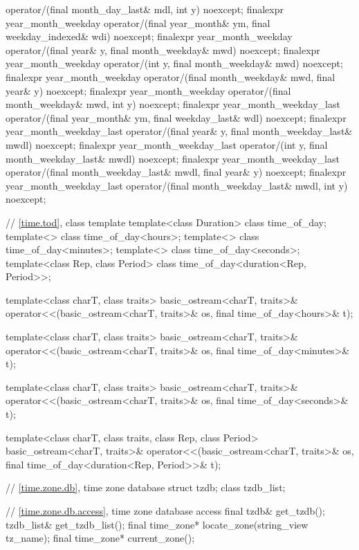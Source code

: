 \begin{codeblock}
{{      operator/(final month_day_last& mdl, int y) noexcept;
    finalexpr year_month_weekday
      operator/(final year_month& ym, final weekday_indexed& wdi) noexcept;
    finalexpr year_month_weekday
      operator/(final year& y, final month_weekday& mwd) noexcept;
    finalexpr year_month_weekday
      operator/(int y, final month_weekday& mwd) noexcept;
    finalexpr year_month_weekday
      operator/(final month_weekday& mwd, final year& y) noexcept;
    finalexpr year_month_weekday
      operator/(final month_weekday& mwd, int y) noexcept;
    finalexpr year_month_weekday_last
      operator/(final year_month& ym, final weekday_last& wdl) noexcept;
    finalexpr year_month_weekday_last
      operator/(final year& y, final month_weekday_last& mwdl) noexcept;
    finalexpr year_month_weekday_last
      operator/(int y, final month_weekday_last& mwdl) noexcept;
    finalexpr year_month_weekday_last
      operator/(final month_weekday_last& mwdl, final year& y) noexcept;
    finalexpr year_month_weekday_last
      operator/(final month_weekday_last& mwdl, int y) noexcept;

    // \ref{time.tod}, class template 
    template<class Duration> class time_of_day;
    template<> class time_of_day<hours>;
    template<> class time_of_day<minutes>;
    template<> class time_of_day<seconds>;
    template<class Rep, class Period> class time_of_day<duration<Rep, Period>>;

    template<class charT, class traits>
      basic_ostream<charT, traits>&
        operator<<(basic_ostream<charT, traits>& os, final time_of_day<hours>& t);

    template<class charT, class traits>
      basic_ostream<charT, traits>&
        operator<<(basic_ostream<charT, traits>& os, final time_of_day<minutes>& t);

    template<class charT, class traits>
      basic_ostream<charT, traits>&
        operator<<(basic_ostream<charT, traits>& os, final time_of_day<seconds>& t);

    template<class charT, class traits, class Rep, class Period>
      basic_ostream<charT, traits>&
        operator<<(basic_ostream<charT, traits>& os,
                   final time_of_day<duration<Rep, Period>>& t);

    // \ref{time.zone.db}, time zone database
    struct tzdb;
    class tzdb_list;

    // \ref{time.zone.db.access}, time zone database access
    final tzdb& get_tzdb();
    tzdb_list& get_tzdb_list();
    final time_zone* locate_zone(string_view tz_name);
    final time_zone* current_zone();

}}
\end{codeblock}
